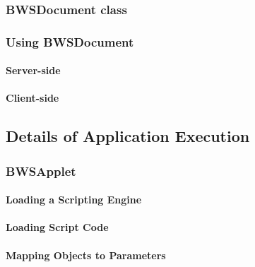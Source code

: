    

   \subsubsection{BWSDocument class}
   \label{sec:docRewritting}
     
    
     
   \subsubsection{Using BWSDocument}
    \paragraph{Server-side}
    \paragraph{Client-side}
   \subsection{Details of Application Execution}
   
    
    
    \subsubsection{BWSApplet}

     
     
     \paragraph{Loading a Scripting Engine}
     
      
     
     \paragraph{Loading Script Code}
    
      
    
     \paragraph{Mapping Objects to Parameters}
      \label{sec:mapParamObject}
     
      
     
